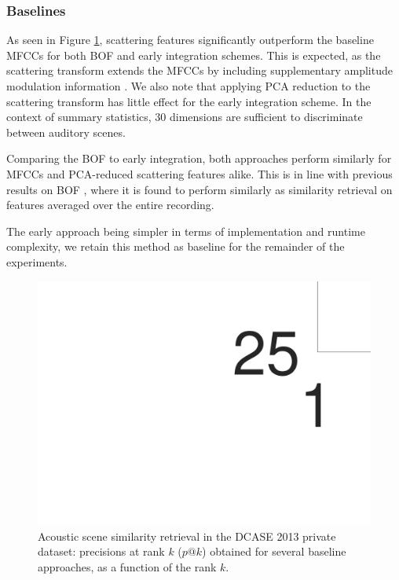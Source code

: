 \documentclass[smallextended]{svjour3}
\begin{document}
\subsubsection*{Baselines}

As seen in Figure \ref{fig:ASS_-1}, scattering features significantly outperform the baseline MFCCs for both BOF and early integration schemes.
This is expected, as the scattering transform extends the MFCCs by including supplementary amplitude modulation information \cite{Anden2014}.
We also note that applying PCA reduction to the scattering transform has little effect for the early integration scheme.
In the context of summary statistics, $30$ dimensions are sufficient to discriminate between auditory scenes.

Comparing the BOF to early integration, both approaches perform similarly for MFCCs and PCA-reduced scattering features alike.
This is in line with previous results on BOF \cite{lagrange:hal-01082501}, where it is found to perform similarly as similarity retrieval on features averaged over the entire recording.

The early approach being simpler in terms of implementation and runtime complexity, we retain this method as baseline for the remainder of the experiments.

\begin{figure}[t]
\begin{center}
\includegraphics[width=\columnwidth]{figures/baselines}
\caption{Acoustic scene similarity retrieval in the DCASE 2013 private dataset: precisions at rank $k$ ($p@k$) obtained for several baseline approaches, as a function of the rank $k$.}
\label{fig:ASS_-1}
\end{center}
\end{figure}
\end{document}
